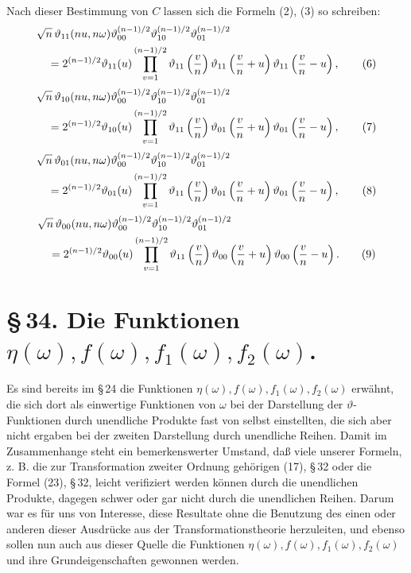 \documentclass[11pt]{article}
\providecommand{\tht}{\vartheta}
\begin{document}
Nach dieser Bestimmung von $C$ lassen sich die Formeln (2), (3) so schreiben:
\begin{align}
&\sqrt n\,\tht_{11}(nu,n\omega)\tht_{00}^{(n-1)/2}\tht_{10}^{(n-1)/2}\tht_{01}^{(n-1)/2} \notag\\
&\quad=2^{(n-1)/2}\tht_{11}(u)\prod_{v=1}^{(n-1)/2}
\tht_{11}\left({v\over n}\right)
\tht_{11}\left({v\over n}+u\right)
\tht_{11}\left({v\over n}-u\right), \tag{6}
\end{align}
\begin{align}
&\sqrt n\,\tht_{10}(nu,n\omega)\tht_{00}^{(n-1)/2}\tht_{10}^{(n-1)/2}\tht_{01}^{(n-1)/2}\notag\\
&\quad=2^{(n-1)/2}\tht_{10}(u)\prod_{v=1}^{(n-1)/2}
\tht_{11}\left({v\over n}\right)
\tht_{01}\left({v\over n}+u\right)
\tht_{01}\left({v\over n}-u\right), \tag{7}
\end{align}
\begin{align}
&\sqrt n\,\tht_{01}(nu,n\omega)\tht_{00}^{(n-1)/2}\tht_{10}^{(n-1)/2}\tht_{01}^{(n-1)/2}\notag\\
&\quad=2^{(n-1)/2}\tht_{01}(u)\prod_{v=1}^{(n-1)/2}
\tht_{11}\left({v\over n}\right)
\tht_{01}\left({v\over n}+u\right)
\tht_{01}\left({v\over n}-u\right), \tag{8}
\end{align}
\begin{align}
&\sqrt n\,\tht_{00}(nu,n\omega)\tht_{00}^{(n-1)/2}\tht_{10}^{(n-1)/2}\tht_{01}^{(n-1)/2}\notag\\
&\quad=2^{(n-1)/2}\tht_{00}(u)\prod_{v=1}^{(n-1)/2}
\tht_{11}\left({v\over n}\right)
\tht_{00}\left({v\over n}+u\right)
\tht_{00}\left({v\over n}-u\right). \tag{9}
\end{align}

\section*{\S\,34. Die Funktionen $\eta(\omega), f(\omega), f_1(\omega), f_2(\omega)$.}

Es sind bereits im \S\,24 die Funktionen $\eta(\omega),f(\omega),f_1(\omega),f_2(\omega)$ erwähnt, die sich dort als einwertige Funktionen von $\omega$ bei der Darstellung der $\vartheta$-Funktionen durch unendliche Produkte fast von selbst einstellten, die sich aber nicht ergaben bei der zweiten Darstellung durch unendliche Reihen. Damit im Zusammenhange steht ein bemerkenswerter Umstand, daß viele unserer Formeln, z. B. die zur Transformation zweiter Ordnung gehörigen (17), \S\,32 oder die Formel (23), \S\,32, leicht verifiziert werden können durch die unendlichen Produkte, dagegen schwer oder gar nicht durch die unendlichen Reihen. Darum war es für uns von Interesse, diese Resultate ohne die Benutzung des einen oder anderen dieser Ausdrücke aus der Transformationstheorie herzuleiten, und ebenso sollen nun auch aus dieser Quelle die Funktionen $\eta(\omega),f(\omega),f_1(\omega),f_2(\omega)$ und ihre Grundeigenschaften gewonnen werden.
\end{document}
